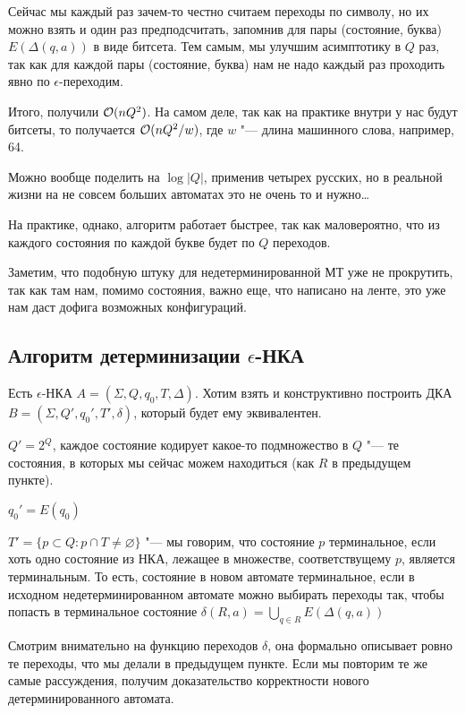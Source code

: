 Сейчас мы каждый раз зачем-то честно считаем переходы по символу, но их можно взять и один раз предподсчитать, запомнив для пары (состояние, буква) $E(\Delta(q, a))$ в виде битсета. 
Тем самым, мы улучшим асимптотику в $Q$ раз, так как для каждой пары (состояние, буква) нам не надо каждый раз проходить явно по $\epsilon$-переходим.

Итого, получили $\mathcal{O}(nQ^2)$. На самом деле, так как на практике внутри у нас будут битсеты, то получается $\mathcal{O}(nQ^2/w)$, где $w$ "--- длина машинного слова, например, 64.

Можно вообще поделить на $\log |Q|$, применив четырех русских, но в реальной жизни на не совсем больших автоматах это не очень то и нужно\dots

\begin{Rem}
На практике, однако, алгоритм работает быстрее, так как маловероятно, что из каждого состояния по каждой букве будет по $Q$ переходов.
\end{Rem}

\begin{Rem}
Заметим, что подобную штуку для недетерминированной МТ уже не прокрутить, так как там нам, помимо состояния, важно еще, что написано на ленте, это уже нам даст дофига возможных конфигураций.
\end{Rem}


\subsection{Алгоритм детерминизации \texorpdfstring{$\epsilon$}{epsilon}-НКА}
Есть $\epsilon$-НКА $A = (\Sigma, Q, q_0, T, \Delta)$. 
Хотим взять и конструктивно построить ДКА $B = (\Sigma, Q', q_0', T', \delta)$, который будет ему эквивалентен.

$Q' = 2^Q$, каждое состояние кодирует какое-то подмножество в $Q$ "--- те состояния, в которых мы сейчас можем находиться (как $R$ в предыдущем пункте).

$q_0' = E(q_0)$

$T' = \{p \subset Q: p \cap T \neq \varnothing\}$ "--- мы говорим, что состояние $p$ терминальное, если хоть одно состояние из НКА, лежащее в множестве, соответствущему $p$, является терминальным.
То есть, состояние в новом автомате терминальное, если в исходном недетерминированном автомате можно выбирать переходы так, чтобы попасть в терминальное состояние
$\delta(R, a) = \bigcup\limits_{q \in R} E(\Delta(q, a))$

Смотрим внимательно на функцию переходов $\delta$, она формально описывает ровно те переходы, что мы делали в предыдущем пункте.
Если мы повторим те же самые рассуждения, получим доказательство корректности нового детерминированного автомата.

